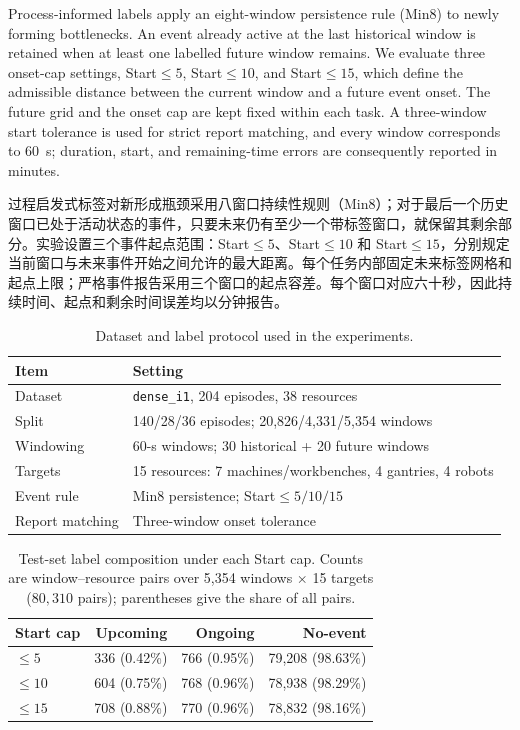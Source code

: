 \documentclass[a4paper,fleqn]{cas-dc}
\newcommand{\zhpara}[1]{%
  \par\begingroup\small\color{black!72}\noindent #1\par\endgroup}
\begin{document}
Process-informed labels apply an eight-window persistence rule (Min8) to newly forming bottlenecks. An event already active at the last historical window is retained when at least one labelled future window remains. We evaluate three onset-cap settings, Start$\leq5$, Start$\leq10$, and Start$\leq15$, which define the admissible distance between the current window and a future event onset. The future grid and the onset cap are kept fixed within each task. A three-window start tolerance is used for strict report matching, and every window corresponds to 60~s; duration, start, and remaining-time errors are consequently reported in minutes.

\zhpara{过程启发式标签对新形成瓶颈采用八窗口持续性规则（Min8）；对于最后一个历史窗口已处于活动状态的事件，只要未来仍有至少一个带标签窗口，就保留其剩余部分。实验设置三个事件起点范围：Start$\leq5$、Start$\leq10$ 和 Start$\leq15$，分别规定当前窗口与未来事件开始之间允许的最大距离。每个任务内部固定未来标签网格和起点上限；严格事件报告采用三个窗口的起点容差。每个窗口对应六十秒，因此持续时间、起点和剩余时间误差均以分钟报告。}

\begin{table}[t]
\centering
\caption{Dataset and label protocol used in the experiments.}
\label{tab:exp-dataset}
\scriptsize
\setlength{\tabcolsep}{4pt}
\renewcommand{\arraystretch}{1.08}
\begin{tabularx}{\columnwidth}{@{}lX@{}}
\toprule
Item & Setting \\
\midrule
Dataset & \texttt{dense\_i1}, 204 episodes, 38 resources \\
Split & 140/28/36 episodes; 20,826/4,331/5,354 windows \\
Windowing & 60-s windows; 30 historical + 20 future windows \\
Targets & 15 resources: 7 machines/workbenches, 4 gantries, 4 robots \\
Event rule & Min8 persistence; Start$\leq5/10/15$ \\
Report matching & Three-window onset tolerance \\
\bottomrule
\end{tabularx}
\end{table}

\begin{table}[t]
\centering
\caption{Test-set label composition under each Start cap. Counts are window--resource pairs over 5,354 windows $\times$ 15 targets ($80{,}310$ pairs); parentheses give the share of all pairs.}
\label{tab:dataset-labels}
\scriptsize
\setlength{\tabcolsep}{3.2pt}
\renewcommand{\arraystretch}{1.08}
\begin{tabular*}{\columnwidth}{@{\extracolsep{\fill}}lrrr@{}}
\toprule
Start cap & Upcoming & Ongoing & No-event \\
\midrule
$\leq5$ & 336 (0.42\%) & 766 (0.95\%) & 79,208 (98.63\%) \\
$\leq10$ & 604 (0.75\%) & 768 (0.96\%) & 78,938 (98.29\%) \\
$\leq15$ & 708 (0.88\%) & 770 (0.96\%) & 78,832 (98.16\%) \\
\bottomrule
\end{tabular*}
\end{table}
\end{document}
